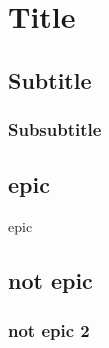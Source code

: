 \clearpage

\section{Title}

\lipsum[5]

\subsection{Subtitle}

\lipsum[5]

\subsubsection{Subsubtitle}

\lipsum[5]


\lipsum[5]

\begin{appendixd}
	\section{epic}
	epic
	
	\subsection{not epic}
	\subsubsection{not epic 2}
\end{appendixd}